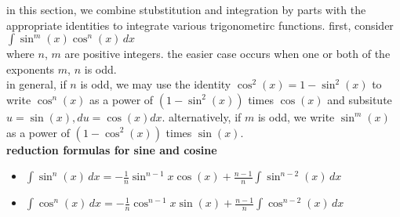 \documentclass{article}
\begin{document}
in this section, we combine stubstitution and integration by parts with the appropriate identities to integrate various trigonometirc functions. first, consider\\ $\int \sin^m(x)\cos^n(x)\,dx$\\ where $n$, $m$ are positive integers. the easier case occurs when one or both of the exponents $m$, $n$ is odd.\\

in general, if $n$ is odd, we may use the identity $\cos^2(x) = 1 - \sin^2(x)$ to write $\cos^n(x)$ as a power of $(1 - \sin^2(x))$ times $\cos(x)$ and subsitute $u = \sin(x), du = \cos(x)dx$. alternatively, if $m$ is odd, we write $\sin^m(x)$ as a power of $(1 - \cos^2(x))$ times $\sin(x)$.\\

\textbf{reduction formulas for sine and cosine}
	\begin{itemize}
		\item $\int\sin^n(x)\,dx = -\frac{1}{n}\sin^{n-1}x\cos(x) + \frac{n-1}{n}\int\sin^{n-2}(x)\,dx$
		\item $\int\cos^n(x)\,dx = -\frac{1}{n}\cos^{n-1}x\sin(x) + \frac{n-1}{n}\int\cos^{n-2}(x)\,dx$ 
	\end{itemize}
\end{document}
